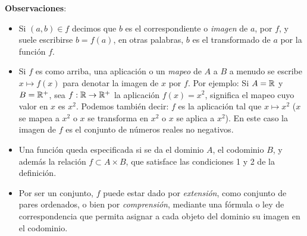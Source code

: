 \textbf{Observaciones}:
\begin{itemize}
	\item Si $(a, b) \in f$ decimos que $b$ es el correspondiente o \textit{imagen} de $a$,
	por $f$, y suele escribirse $b = f(a)$, en otras palabras, $b$ es el transformado de $a$
	por la función $f$.
	\item Si $f$ es como arriba, una aplicación o un \textit{mapeo} de $A$ a $B$ a menudo se escribe $x \mapsto f(x)$ para denotar la imagen de $x$ por $f$. Por ejemplo: Si $A = \mathbb{R}$ y  $B = \mathbb{R}^{+}$, sea $f: \mathbb{R} \rightarrow \mathbb{R}^{+}$ la aplicación $f(x) = x^2$, significa el mapeo cuyo valor en $x$ es $x^2$. Podemos también decir: $f$ es la aplicación tal que $x \mapsto x^2$ ($x$ se mapea a $x^2$ o $x$ se transforma en $x^2$ o $x$ se aplica a $x^2$). En este caso la imagen de $f$ es el conjunto de números reales no negativos.
	\item Una función queda especificada si se da el dominio $A$, el codominio $B$,
	y además la relación $f \subset A \times B$, que satisface las condiciones 1 y
	2 de la definición.
	\item Por ser un conjunto, $f$ puede estar dado por \textit{extensión}, como conjunto de pares ordenados, o bien por \textit{comprensión}, mediante una fórmula o ley de correspondencia que permita asignar a cada objeto del dominio su imagen en el codominio.
\end{itemize}%


